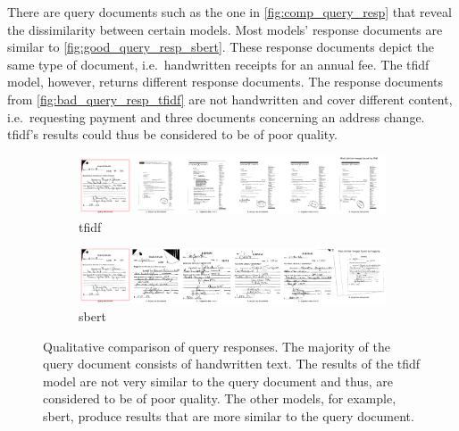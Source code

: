There are query documents such as the one in \autoref{fig:comp_query_resp} that reveal the dissimilarity between certain models.
Most models' response documents are similar to \autoref{fig:good_query_resp_sbert}.
These response documents depict the same type of document, i.e.\ handwritten receipts for an annual fee.
The \ac{tfidf} model, however, returns different response documents.
The response documents from \autoref{fig:bad_query_resp_tfidf} are not handwritten and cover different content, 
i.e.\ requesting payment and three documents concerning an address change.
\ac{tfidf}'s results could thus be considered to be of poor quality.

\begin{figure}[h!]
    \begin{subfigure}{\textwidth}
        \centering
        \includegraphics[width=1\textwidth]{images/query_results/4542b223317eba23e4bda3e1536d61c8e2d2890a6439830ca8c62650bc1aac70/Most_similar_images_found_by_tfidf.pdf}
        \caption{\ac{tfidf}}
        \label{fig:bad_query_resp_tfidf}
    \end{subfigure}

    \begin{subfigure}{\textwidth}
        \centering
        \includegraphics[width=1\textwidth]{images/query_results/4542b223317eba23e4bda3e1536d61c8e2d2890a6439830ca8c62650bc1aac70/Most_similar_images_found_by_hugging.pdf}
        \caption{\ac{sbert}}
        \label{fig:good_query_resp_sbert}
    \end{subfigure}
\caption[Qualitative comparison of query responses]{Qualitative comparison of query responses.
The majority of the query document consists of handwritten text.
The results of the \ac{tfidf} model are not very similar to the query document and thus, are considered to be of poor quality.
The other models, for example, \ac{sbert}, produce results that are more similar to the query document.
}
\label{fig:comp_query_resp}
\end{figure}

